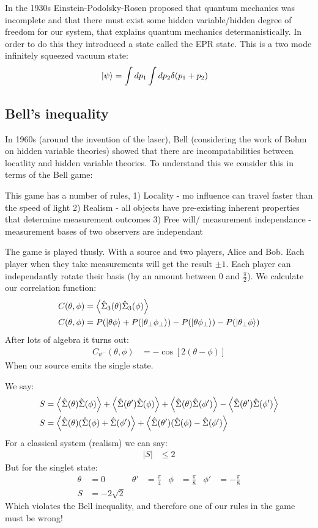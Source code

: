 In the 1930s Einstein-Podolsky-Rosen proposed that quantum mechanics was incomplete and that there must exist some hidden variable/hidden degree of freedom for our system, that explains quantum mechanics determanistically.
In order to do this they introduced a state called the EPR state. This is a two mode infinitely squeezed vacuum state:
\begin{align*}
	\ket{\psi} &= \int dp_1\int dp_2 \delta(p_1 + p_2)
\end{align*}
\subsection{Bell's inequality}
In 1960s (around the invention of the laser), Bell (considering the work of Bohm on hidden variable theories) showed that there are incompatabilities between locatlity and hidden variable theories. To understand this we consider this in terms of the Bell game:

This game has a number of rules, 1) Locality - mo influence can travel faster than the speed of light 
2) Realism - all objects have pre-existing inherent properties that determine measurement outcomes 
3) Free will/ measurement independance - measurement bases of two observers are independant

The game is played thusly. With a source and two players, Alice and Bob. Each player when they take measurements will get the result $\pm 1$. Each player can independantly rotate their basis (by an amount between $0$ and $\frac{\pi}{2}$).
We calculate our correlation function:
\begin{align*}
	C(\theta,\phi) &= \expval{\hat{\Sigma}_3(\theta)\hat{\Sigma}_3(\phi)} \\
	C(\theta,\phi) &= P(\ket{\theta\phi} + P(\ket{\theta_\perp\phi_\perp}) - P(\ket{\theta\phi_\perp}) - P(\ket{\theta_\perp\phi})
\end{align*}
After lots of algebra it turns out:
\begin{align*}
	C_{\psi^-}(\theta,\phi) &= -\cos[2(\theta-\phi)]
\end{align*}
When our source emits the single state.

We say:
\begin{align*}
	S &= \expval{\hat{\Sigma}(\theta)\hat{\Sigma}(\phi)} + \expval{\hat{\Sigma}(\theta')\hat{\Sigma}(\phi)} + \expval{\hat{\Sigma}(\theta)\hat{\Sigma}(\phi')} - \expval{\hat{\Sigma}(\theta')\hat{\Sigma}(\phi')} \\
	S &= \expval{\hat{\Sigma}(\theta)(\hat{\Sigma}(\phi) + \hat{\Sigma}(\phi')} + \expval{\hat{\Sigma}(\theta')(\hat{\Sigma}(\phi) - \hat{\Sigma}(\phi')}
\end{align*}
For a classical system (realism) we can say:
\begin{align*}
	|S| &\leq 2
\end{align*}
But for the singlet state:
\begin{align*}
	\theta &= 0 & \theta' &= \frac{\pi}{4} & \phi &= \frac{\pi}{8} & \phi' &= -\frac{\pi}{8} \\
	S &= -2\sqrt{2}
\end{align*}
Which violates the Bell inequality, and therefore one of our rules in the game must be wrong!

